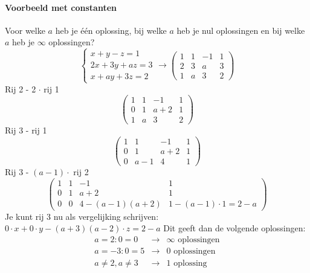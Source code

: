 \paragraph{Voorbeeld met constanten} \label{par:constantenprobleem}
Voor welke $a$ heb je \'e\'en oplossing, bij welke $a$ heb je nul oplossingen en bij welke $a$ heb je $\infty$ oplossingen?
\[ \left\{ \begin{array}{r}
	x + y - z = 1 \\
	2x + 3y + az = 3 \\
	x + ay +3z = 2
\end{array} \right. \to \left(\! \begin{array}{rrr|r}
	1 & 1 & -1 & 1 \\
	2 & 3 & a & 3 \\
	1 & a & 3 & 2
\end{array} \!\right) \]
Rij 2 - 2 $\cdot$ rij 1
\[ \left(\! \begin{array}{ccc|c}
	1 & 1 & -1 & 1 \\
	0 & 1 & a+2 & 1 \\
	1 & a & 3 & 2
\end{array} \!\right) \]
Rij 3 - rij 1
\[ \left(\! \begin{array}{ccc|c}
	1 & 1 & -1 & 1 \\
	0 & 1 & a+2 & 1 \\
	0 & a-1 & 4 & 1
\end{array} \!\right) \]
Rij 3 - $(a-1) \cdot$ rij 2
\[ \left(\! \begin{array}{ccc|c}
	1 & 1 & -1 & 1 \\
	0 & 1 & a+2 & 1 \\
	0 & 0 & 4-(a-1)(a+2) & 1-(a-1)\cdot 1 = 2-a
\end{array} \!\right) \]
Je kunt rij 3 nu als vergelijking schrijven: $0 \cdot x + 0 \cdot y - (a+3)(a-2) \cdot z = 2-a$
Dit geeft dan de volgende oplossingen:
\begin{eqnarray*}
	a = 2: 0=0 & \to & \infty \mbox{ oplossingen} \\
	a = -3: 0=5 & \to & 0 \mbox{ oplossingen} \\
	a \neq 2, a \neq 3 & \to & 1 \mbox{ oplossing}
\end{eqnarray*}